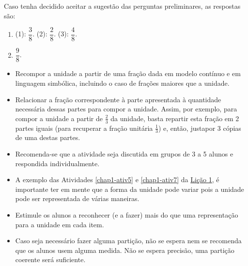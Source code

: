 \begin{atividade}
  Caso tenha decidido aceitar a sugestão das perguntas preliminares, as respostas são:
\begin{multicols}{2}
\begin{enumerate} %
    \item       (1):       $\dfrac{3}{8}$. (2):       $\dfrac{2}{8}$. (3):       $\dfrac{4}{8}$.
    \item             $\dfrac{9}{8}$.
\end{enumerate} %
\end{multicols}

\end{atividade}

\begin{atividade}\label{chap2-ativ11}
\objetivos
 \begin{itemize} %
    \item       Recompor a unidade a partir de uma fração dada em modelo contínuo e em linguagem simbólica, incluindo o caso de frações maiores que a unidade.
    \item       Relacionar a fração correspondente à parte apresentada à quantidade necessária dessas partes para compor a unidade. Assim, por exemplo, para compor a unidade a partir de       $\frac{2}{3}$ da unidade, basta repartir esta fração em 2 partes iguais (para recuperar a fração unitária       $\frac{1}{3}$) e, então, justapor 3 cópias de uma destas partes.
\end{itemize} %

\discussoes
  \begin{itemize} %
    \item Recomenda-se que a atividade seja discutida em grupos de 3 a 5 alunos e respondida individualmente.
 \item A exemplo das Atividades \ref{chap1-ativ5} e \ref{chap1-ativ7} da \hyperref[chap1]{Lição 1}, é importante ter em mente que a forma da unidade pode variar pois a unidade pode ser representada de várias maneiras.
    \item Estimule os alunos a reconhecer (e a fazer) mais do que uma representação para a unidade em cada item.
    \item Caso seja necessário fazer alguma partição, não se espera nem se recomenda que os alunos usem alguma medida. Não se espera precisão, uma partição coerente será suficiente. 
\end{itemize} %


\end{atividade}
